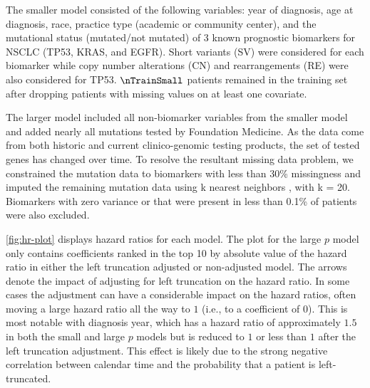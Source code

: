 \documentclass[11pt,final,fleqn]{article}\usepackage[]{graphicx}\usepackage[]{color}
\theoremstyle{plain}
\begin{document}
The smaller model consisted of the following variables: year of diagnosis, age at diagnosis, race, practice type (academic or community center), and the mutational status (mutated/not mutated) of 3 known prognostic biomarkers for NSCLC (TP53, KRAS, and EGFR). Short variants (SV) were considered for each biomarker while copy number alterations (CN) and rearrangements (RE) were also considered for TP53. $\nTrainSmall$ patients remained in the training set after dropping patients with missing values on at least one covariate. 

The larger model included all non-biomarker variables from the smaller model and added nearly all mutations tested by Foundation Medicine. As the data come from both historic and current clinico-genomic testing products, the set of tested genes has changed over time. To resolve the resultant missing data problem, we constrained the mutation data to biomarkers with less than 30\% missingness and imputed the remaining mutation data using k nearest neighbors \cite{troyanskaya_missing_2001}, with k = 20. Biomarkers with zero variance or that were present in less than 0.1\% of patients were also excluded.

\autoref{fig:hr-plot} displays hazard ratios for each model. The plot for the large $p$ model only contains coefficients ranked in the top 10 by absolute value of the hazard ratio in either the left truncation adjusted or non-adjusted model.  The arrows denote the impact of adjusting for left truncation on the hazard ratio. In some cases the adjustment can have a considerable impact on the hazard ratios, often moving a large hazard ratio all the way to $1$ (i.e., to a coefficient of $0$). This is most notable with diagnosis year, which has a hazard ratio of approximately $1.5$ in both the small and large $p$ models but is reduced to $1$ or less than $1$ after the left truncation adjustment. This effect is likely due to the strong negative correlation between calendar time and the probability that a patient is left-truncated. 
\end{document}
